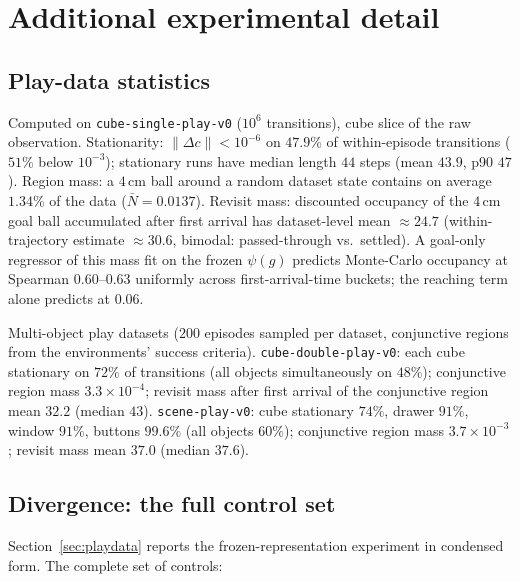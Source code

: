 \documentclass{article}
\newcommand{\cube}{c}
\begin{document}



\appendix
\section{Additional experimental detail}
\label{app:detail}

\subsection{Play-data statistics}
\label{app:playstats}

Computed on \texttt{cube-single-play-v0} ($10^6$ transitions), cube slice of
the raw observation. Stationarity: $\|\Delta\cube\|<10^{-6}$ on $47.9\%$ of
within-episode transitions ($51\%$ below $10^{-3}$); stationary runs have
median length $44$ steps (mean $43.9$, p90 $47$). Region mass: a $4$\,cm ball
around a random dataset state contains on average $1.34\%$ of the data
($\bar N=0.0137$). Revisit mass: discounted occupancy of the $4$\,cm goal ball
accumulated after first arrival has dataset-level mean $\approx24.7$
(within-trajectory estimate $\approx30.6$, bimodal: passed-through vs.\
settled). A goal-only regressor of this mass fit on the frozen $\psi(g)$
predicts Monte-Carlo occupancy at Spearman $0.60$--$0.63$ uniformly across
first-arrival-time buckets; the reaching term alone predicts at $0.06$.

Multi-object play datasets ($200$ episodes sampled per dataset, conjunctive
regions from the environments' success criteria).
\texttt{cube-double-play-v0}: each cube stationary on $72\%$ of transitions
(all objects simultaneously on $48\%$); conjunctive region mass
$3.3\times10^{-4}$; revisit mass after first arrival of the conjunctive region
mean $32.2$ (median $43$). \texttt{scene-play-v0}: cube stationary $74\%$,
drawer $91\%$, window $91\%$, buttons $99.6\%$ (all objects $60\%$);
conjunctive region mass $3.7\times10^{-3}$; revisit mass mean $37.0$ (median
$37.6$).

\subsection{Divergence: the full control set}
\label{app:diverge}

Section~\ref{sec:playdata} reports the frozen-representation experiment in
condensed form. The complete set of controls:
\end{document}

